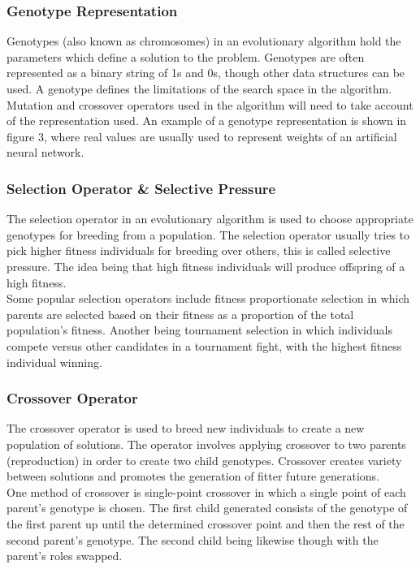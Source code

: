 \documentclass[12pt,a4paper]{article}
\begin{document}
\subsubsection*{Genotype Representation}
Genotypes (also known as chromosomes) in an evolutionary algorithm hold the parameters which define a solution to the problem. Genotypes are often represented as a binary string of 1s and 0s, though other data structures can be used. A genotype defines the limitations of the search space in the algorithm. Mutation and crossover operators used in the algorithm will need to take account of the representation used. An example of a genotype representation is shown in figure 3, where real values are usually used to represent weights of an artificial neural network.\\

\begin{figure}[h]
\end{figure}

\vspace{3mm}

\subsubsection*{Selection Operator \& Selective Pressure}
The selection operator in an evolutionary algorithm is used to choose appropriate genotypes for breeding from a population. The selection operator usually tries to pick higher fitness individuals for breeding over others, this is called selective pressure. The idea being that high fitness individuals will produce offspring of a high fitness.\\

Some popular selection operators include fitness proportionate selection in which parents are selected based on their fitness as a proportion of the total population's fitness. Another being tournament selection in which individuals compete versus other candidates in a tournament fight, with the highest fitness individual winning.\\

\subsubsection*{Crossover Operator}
The crossover operator is used to breed new individuals to create a new population of solutions. The operator involves applying crossover to two parents (reproduction) in order to create two child genotypes. Crossover creates variety between solutions and promotes the generation of fitter future generations.\\
\newpage
One method of crossover is single-point crossover in which a single point of each parent's genotype is chosen. The first child generated consists of the genotype of the first parent up until the determined crossover point and then the rest of the second parent's genotype. The second child being likewise though with the parent's roles swapped.\\
\end{document}
